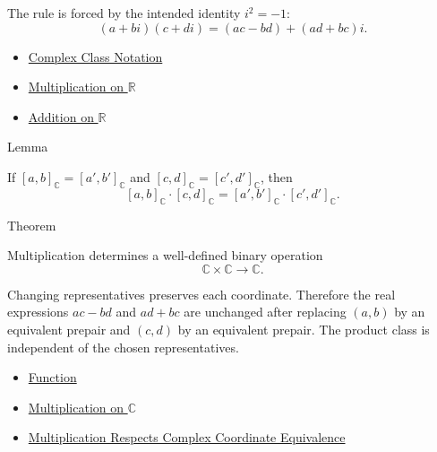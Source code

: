 \begin{remark*}
The rule is forced by the intended identity \(i^2=-1\):
\[
(a+bi)(c+di)=(ac-bd)+(ad+bc)i.
\]
\end{remark*}

\begin{dependencies}
\begin{itemize}
  \item \hyperref[def:complex-class-notation]{Complex Class Notation}
  \item \hyperref[def:multiplication-on-r]{Multiplication on $\mathbb{R}$}
  \item \hyperref[def:addition-on-r]{Addition on $\mathbb{R}$}
\end{itemize}
\end{dependencies}

\begin{lemmabox}{Lemma}
\begin{lemma}
\label{lem:multiplication-on-c-respects-equivalence}
If $[a,b]_{\mathbb{C}}=[a',b']_{\mathbb{C}}$ and
$[c,d]_{\mathbb{C}}=[c',d']_{\mathbb{C}}$, then
\[
[a,b]_{\mathbb{C}}\cdot[c,d]_{\mathbb{C}}
=
[a',b']_{\mathbb{C}}\cdot[c',d']_{\mathbb{C}}.
\]
\end{lemma}
\end{lemmabox}

\begin{theorembox}{Theorem}
\begin{theorem}
\label{thm:multiplication-on-c-well-defined}
Multiplication determines a well-defined binary operation
\[
\mathbb{C}\times\mathbb{C}\to\mathbb{C}.
\]
\end{theorem}
\end{theorembox}

\begin{remark*}
Changing representatives preserves each coordinate. Therefore the real
expressions \(ac-bd\) and \(ad+bc\) are unchanged after replacing
\((a,b)\) by an equivalent prepair and \((c,d)\) by an equivalent prepair.
The product class is independent of the chosen representatives.
\end{remark*}

\begin{dependencies}
\begin{itemize}
  \item \hyperref[def:function]{Function}
  \item \hyperref[def:multiplication-on-c-classes]{Multiplication on $\mathbb{C}$}
  \item \hyperref[lem:multiplication-on-c-respects-equivalence]{Multiplication Respects Complex Coordinate Equivalence}
\end{itemize}
\end{dependencies}

